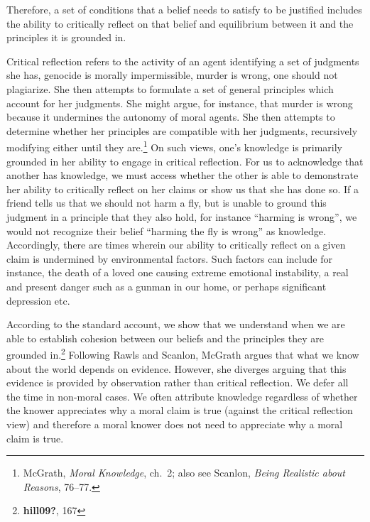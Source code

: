 \documentclass[phdthesis,12pt,final]{wuthesis}
\theoremstyle{definition}
\theoremstyle{definition}
\theoremstyle{definition}
\theoremstyle{definition}
\theoremstyle{remark}
\begin{document}
\label{refl-equi}
Therefore, a set of conditions that a belief needs to satisfy to be justified includes the ability to critically reflect on that belief and equilibrium between it and the principles it is grounded in.

Critical reflection refers to the activity of an agent identifying a set of judgments she has, genocide is morally impermissible, murder is wrong, one should not plagiarize. She then attempts to formulate a set of general principles which account for her judgments. She might argue, for instance, that murder is wrong because it undermines the autonomy of moral agents. She then attempts to determine whether her principles are compatible with her judgments, recursively modifying either until they are.\footnote{McGrath, \emph{Moral {Knowledge}}, ch.~2; also see Scanlon, \emph{Being Realistic about Reasons}, 76--77.} On such views, one's knowledge is primarily grounded in her ability to engage in critical reflection. For us to acknowledge that another has knowledge, we must access whether the other is able to demonstrate her ability to critically reflect on her claims or show us that she has done so. If a friend tells us that we should not harm a fly, but is unable to ground this judgment in a principle that they also hold, for instance ``harming is wrong'', we would not recognize their belief ``harming the fly is wrong'' as knowledge. Accordingly, there are times wherein our ability to critically reflect on a given claim is undermined by environmental factors. Such factors can include for instance, the death of a loved one causing extreme emotional instability, a real and present danger such as a gunman in our home, or perhaps significant depression etc.

According to the standard account, we show that we understand when we are able to establish cohesion between our beliefs and the principles they are grounded in.\footnote{\textbf{hill09?}, 167} Following Rawls and Scanlon, McGrath argues that what we know about the world depends on evidence. However, she diverges arguing that this evidence is provided by observation rather than critical reflection. We defer all the time in non-moral cases. We often attribute knowledge regardless of whether the knower appreciates why a moral claim is true (against the critical reflection view) and therefore a moral knower does not need to appreciate why a moral claim is true.
\end{document}
